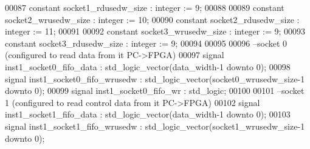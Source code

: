 \begin{DoxyCode}
00087 \textcolor{keywordflow}{constant} \textcolor{vhdlchar}{socket1_rdusedw_size} \textcolor{vhdlchar}{:} \textcolor{comment}{integer} \textcolor{vhdlchar}{:=} \textcolor{vhdllogic}{}\textcolor{vhdllogic}{9}; 
00088 
00089 \textcolor{keywordflow}{constant} \textcolor{vhdlchar}{socket2_wrusedw_size} \textcolor{vhdlchar}{:} \textcolor{comment}{integer} \textcolor{vhdlchar}{:=} \textcolor{vhdllogic}{}\textcolor{vhdllogic}{10};
00090 \textcolor{keywordflow}{constant} \textcolor{vhdlchar}{socket2_rdusedw_size} \textcolor{vhdlchar}{:} \textcolor{comment}{integer} \textcolor{vhdlchar}{:=} \textcolor{vhdllogic}{}\textcolor{vhdllogic}{11};
00091 
00092 \textcolor{keywordflow}{constant} \textcolor{vhdlchar}{socket3_wrusedw_size} \textcolor{vhdlchar}{:} \textcolor{comment}{integer} \textcolor{vhdlchar}{:=} \textcolor{vhdllogic}{}\textcolor{vhdllogic}{9};
00093 \textcolor{keywordflow}{constant} \textcolor{vhdlchar}{socket3_rdusedw_size} \textcolor{vhdlchar}{:} \textcolor{comment}{integer} \textcolor{vhdlchar}{:=} \textcolor{vhdllogic}{}\textcolor{vhdllogic}{9};
00094 
00095 
00096 \textcolor{keyword}{    --socket 0 (configured to read data from it PC->FPGA)}
00097 \textcolor{keywordflow}{signal} \textcolor{vhdlchar}{inst1_socket0_fifo_data}          \textcolor{vhdlchar}{:} \textcolor{comment}{std\_logic\_vector}\textcolor{vhdlchar}{(}\textcolor{vhdlchar}{data_width}\textcolor{vhdlchar}{-}\textcolor{vhdllogic}{}\textcolor{vhdllogic}{1} \textcolor{keywordflow}{downto} \textcolor{vhdllogic}{}\textcolor{vhdllogic}{0}\textcolor{vhdlchar}{)};
00098 \textcolor{keywordflow}{signal} \textcolor{vhdlchar}{inst1_socket0_fifo_wrusedw}       \textcolor{vhdlchar}{:} \textcolor{comment}{std\_logic\_vector}\textcolor{vhdlchar}{(}\textcolor{vhdlchar}{socket0_wrusedw_size}\textcolor{vhdlchar}{-}\textcolor{vhdllogic}{}\textcolor{vhdllogic}{1} \textcolor{keywordflow}{downto} \textcolor{vhdllogic}{}\textcolor{vhdllogic}{0}\textcolor{vhdlchar}{)};
00099 \textcolor{keywordflow}{signal} \textcolor{vhdlchar}{inst1_socket0_fifo_wr}                \textcolor{vhdlchar}{:} \textcolor{comment}{std\_logic};
00100 
00101 \textcolor{keyword}{    --socket 1 (configured to read control data from it PC->FPGA)}
00102 \textcolor{keywordflow}{signal} \textcolor{vhdlchar}{inst1_socket1_fifo_data}          \textcolor{vhdlchar}{:} \textcolor{comment}{std\_logic\_vector}\textcolor{vhdlchar}{(}\textcolor{vhdlchar}{data_width}\textcolor{vhdlchar}{-}\textcolor{vhdllogic}{}\textcolor{vhdllogic}{1} \textcolor{keywordflow}{downto} \textcolor{vhdllogic}{}\textcolor{vhdllogic}{0}\textcolor{vhdlchar}{)};
00103 \textcolor{keywordflow}{signal} \textcolor{vhdlchar}{inst1_socket1_fifo_wrusedw}       \textcolor{vhdlchar}{:} \textcolor{comment}{std\_logic\_vector}\textcolor{vhdlchar}{(}\textcolor{vhdlchar}{socket1_wrusedw_size}\textcolor{vhdlchar}{-}\textcolor{vhdllogic}{}\textcolor{vhdllogic}{1} \textcolor{keywordflow}{downto} \textcolor{vhdllogic}{}\textcolor{vhdllogic}{0}\textcolor{vhdlchar}{)};

\end{DoxyCode}
